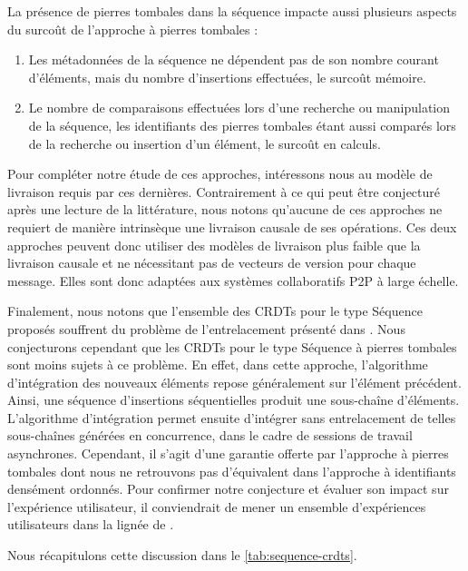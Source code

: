 La présence de pierres tombales dans la séquence impacte aussi plusieurs aspects du surcoût de l'approche à pierres tombales :
\begin{enumerate}
  \item Les métadonnées de la séquence ne dépendent pas de son nombre courant d'éléments, mais du nombre d'insertions effectuées, \ie le surcoût mémoire.
  \item Le nombre de comparaisons effectuées lors d'une recherche ou manipulation de la séquence, les identifiants des pierres tombales étant aussi comparés lors de la recherche ou insertion d'un élément, \ie le surcoût en calculs.
\end{enumerate}

Pour compléter notre étude de ces approches, intéressons nous au modèle de livraison requis par ces dernières.
Contrairement à ce qui peut être conjecturé après une lecture de la littérature, nous notons qu'aucune de ces approches ne requiert de manière intrinsèque une livraison causale de ses opérations.
Ces deux approches peuvent donc utiliser des modèles de livraison plus faible que la livraison causale et ne nécessitant pas de vecteurs de version pour chaque message.
Elles sont donc adaptées aux systèmes collaboratifs \ac{P2P} à large échelle.

Finalement, nous notons que l'ensemble des \acp{CRDT} pour le type Séquence proposés souffrent du problème de l'entrelacement présenté dans \cite{2019-interleaving-anomalies-collaborative-editors-kleppmann}.
Nous conjecturons cependant que les \acp{CRDT} pour le type Séquence à pierres tombales sont moins sujets à ce problème.
En effet, dans cette approche, l'algorithme d'intégration des nouveaux éléments repose généralement sur l'élément précédent.
Ainsi, une séquence d'insertions séquentielles produit une sous-chaîne d'éléments.
L'algorithme d'intégration permet ensuite d'intégrer sans entrelacement de telles sous-chaînes générées en concurrence, \eg dans le cadre de sessions de travail asynchrones.
Cependant, il s'agit d'une garantie offerte par l'approche à pierres tombales dont nous ne retrouvons pas d'équivalent dans l'approche à identifiants densément ordonnés.
Pour confirmer notre conjecture et évaluer son impact sur l'expérience utilisateur, il conviendrait de mener un ensemble d'expériences utilisateurs dans la lignée de \cite{2011-evaluation-crdts-ahmed-nacer,2014-effect-delay-collaborative-editing-ignat,2015-cope-delay-collaborative-note-taking-ignat}.

Nous récapitulons cette discussion dans le \autoref{tab:sequence-crdts}.

